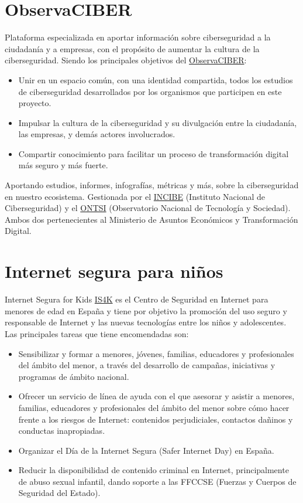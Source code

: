 \documentclass[
  a4paper,
  openany]{book}
\begin{document}
\hypertarget{observaciber}{%
\section{ObservaCIBER}\label{observaciber}}

Plataforma especializada en aportar información sobre ciberseguridad a la ciudadanía y a empresas, con el propósito de aumentar la cultura de la ciberseguridad. Siendo los principales objetivos del \href{https://observaciber.es/}{ObservaCIBER}:

\begin{itemize}
\item
  Unir en un espacio común, con una identidad compartida, todos los estudios de ciberseguridad desarrollados por los organismos que participen en este proyecto.
\item
  Impulsar la cultura de la ciberseguridad y su divulgación entre la ciudadanía, las empresas, y demás actores involucrados.
\item
  Compartir conocimiento para facilitar un proceso de transformación digital más seguro y más fuerte.
\end{itemize}

Aportando estudios, informes, infografías, métricas y más, sobre la ciberseguridad en nuestro ecosistema. Gestionada por el \href{https://www.incibe.es/}{INCIBE} (Instituto Nacional de Ciberseguridad) y el \href{https://www.ontsi.es/es}{ONTSI} (Observatorio Nacional de Tecnología y Sociedad). Ambos dos pertenecientes al Ministerio de Asuntos Económicos y Transformación Digital.

\hypertarget{internet-segura-para-niuxf1os}{%
\section{Internet segura para niños}\label{internet-segura-para-niuxf1os}}

Internet Segura for Kids \href{https://www.is4k.es/}{IS4K} es el Centro de Seguridad en Internet para menores de edad en España y tiene por objetivo la promoción del uso seguro y responsable de Internet y las nuevas tecnologías entre los niños y adolescentes. Las principales tareas que tiene encomendadas son:

\begin{itemize}
\item
  Sensibilizar y formar a menores, jóvenes, familias, educadores y profesionales del ámbito del menor, a través del desarrollo de campañas, iniciativas y programas de ámbito nacional.
\item
  Ofrecer un servicio de línea de ayuda con el que asesorar y asistir a menores, familias, educadores y profesionales del ámbito del menor sobre cómo hacer frente a los riesgos de Internet: contenidos perjudiciales, contactos dañinos y conductas inapropiadas.
\item
  Organizar el Día de la Internet Segura (Safer Internet Day) en España.
\item
  Reducir la disponibilidad de contenido criminal en Internet, principalmente de abuso sexual infantil, dando soporte a las FFCCSE (Fuerzas y Cuerpos de Seguridad del Estado).
\end{itemize}
\end{document}
